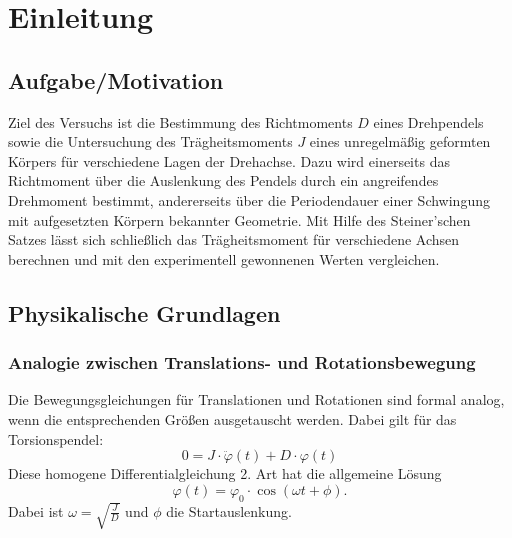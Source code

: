 \chapter{Einleitung}

\section{Aufgabe/Motivation}
Ziel des Versuchs ist die Bestimmung des Richtmoments $D$ eines Drehpendels sowie die Untersuchung des Trägheitsmoments $J$ eines unregelmäßig geformten Körpers für verschiedene Lagen der Drehachse. Dazu wird einerseits das Richtmoment über die Auslenkung des Pendels durch ein angreifendes Drehmoment bestimmt, andererseits über die Periodendauer einer Schwingung mit aufgesetzten Körpern bekannter Geometrie. Mit Hilfe des Steiner’schen Satzes lässt sich schließlich das Trägheitsmoment für verschiedene Achsen berechnen und mit den experimentell gewonnenen Werten vergleichen.

\section{Physikalische Grundlagen}
\subsection*{Analogie zwischen Translations- und Rotationsbewegung}
Die Bewegungsgleichungen für Translationen und Rotationen sind formal analog, wenn die entsprechenden Größen ausgetauscht werden. Dabei gilt für das Torsionspendel:
\begin{equation}
    0 = J \cdot \ddot \varphi(t) + D \cdot \varphi(t)
\end{equation}
Diese homogene Differentialgleichung 2. Art hat die allgemeine Lösung
\begin{equation}
    \varphi(t) = \varphi_0 \cdot \cos(\omega t + \phi).
\end{equation}
Dabei ist $\omega = \sqrt{\frac{J}{D}}$ und $\phi$ die Startauslenkung.

